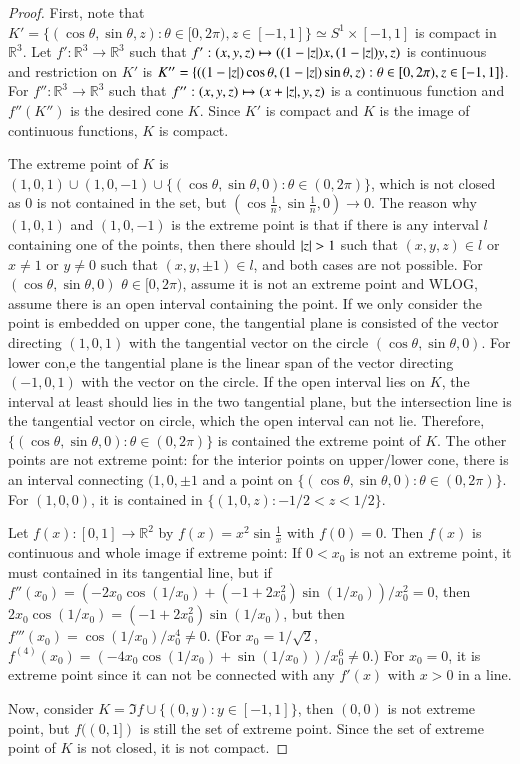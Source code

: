 \documentclass[a4paper, 12pt]{article}
\theoremstyle{Mydefinition}
\theoremstyle{Mytheorem}
\begin{document}
\begin{proof}
    First, note that $K' = \{(\cos \theta, \sin \theta, z):\theta\in [0,2\pi), z\in [-1,1]\} \simeq S^1\times [-1,1]$ is compact in $\mathbb{R}^3$. Let $f':\mathbb{R}^3\rightarrow \mathbb{R}^3$ such that $f':(x, y, z)\mapsto ((1-\abs{z}) x, (1- \abs{z}) y,  z)$ is continuous and restriction on $K'$ is $K'' = \{((1-\abs{z})\cos \theta, (1-\abs{z})\sin \theta, z):\theta\in [0,2\pi), z\in [-1,1]\}$. For $f'':\mathbb{R}^3\rightarrow \mathbb{R}^3$ such that $f'':(x,y,z)\mapsto (x+\abs{z}, y, z)$ is a continuous function and $f''(K'')$ is the desired cone $K$. Since $K'$ is compact and $K$ is the image of continuous functions, $K$ is compact.
    
    The extreme point of $K$ is $(1, 0, 1)\cup (1, 0, -1)\cup \{(\cos \theta, \sin\theta, 0):\theta\in (0, 2\pi)\}$, which is not closed as $0$ is not contained in the set, but $(\cos \frac{1}{n}, \sin \frac{1}{n}, 0)\rightarrow 0$. The reason why $(1,0,1)$ and $(1,0,-1)$ is the extreme point is that if there is any interval $l$ containing one of the points, then there should $\abs{z}>1$ such that $(x,y,z)\in l$ or $x\neq 1$ or $y\neq 0$ such that $(x,y,\pm 1)\in l$, and both cases are not possible. For $(\cos\theta, \sin\theta, 0)$ $\theta\in [0, 2\pi)$, assume it is not an extreme point and WLOG, assume there is an open interval containing the point. If we only consider the point is embedded on upper cone, the tangential plane is consisted of the vector directing $(1,0,1)$ with the tangential vector on the circle $(\cos\theta, \sin\theta, 0)$. For lower con,e the tangential plane is the linear span of the vector directing $(-1,0, 1)$ with the vector on the circle. If the open interval lies on $K$, the interval at least should lies in the two tangential plane, but the intersection line is the tangential vector on circle, which the open interval can not lie. Therefore, $\{(\cos \theta, \sin\theta, 0):\theta\in (0, 2\pi)\}$ is contained the extreme point of $K$. The other points are not extreme point: for the interior points on upper/lower cone, there is an interval connecting $(1, 0, \pm 1$ and a point on $\{(\cos \theta, \sin\theta, 0):\theta\in (0, 2\pi)\}$. For $(1,0,0)$, it is contained in $\{(1,0,z):-1/2<z<1/2\}$.
    
    Let $f(x):[0,1]\rightarrow \mathbb{R}^2$ by $f(x) = x^2\sin \frac{1}{x}$ with $f(0) = 0$. Then $f(x)$ is continuous and whole image if extreme point: If $0<x_0$ is not an extreme point, it must contained in its tangential line, but if $f''(x_0) = (-2 x_0 \cos(1/x_0) + (-1 + 2 x_0^2) \sin(1/x_0))/x_0^2 = 0$, then $2 x_0 \cos(1/x_0) = (-1 + 2 x_0^2) \sin(1/x_0)$, but then $f'''(x_0) = \cos(1/x_0)/x_0^4\neq 0$. (For $x_0=1/\sqrt{2}$, $f^{(4)}(x_0) = (-4 x_0 \cos(1/x_0) + \sin(1/x_0))/x_0^6\neq 0$.) For $x_0 = 0$, it is extreme point since it can not be connected with any $f'(x)$ with $x>0$ in a line.
    
    Now, consider $K = \Im f \cup \{(0, y):y\in[-1, 1]\}$, then $(0,0)$ is not extreme point, but $f((0, 1])$ is still the set of extreme point. Since the set of extreme point of $K$ is not closed, it is not compact.
\end{proof}
\end{document}
